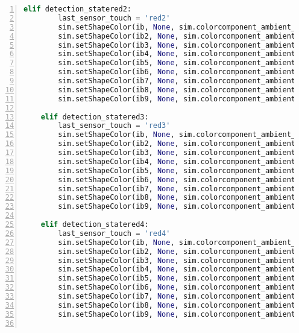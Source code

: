 \begin{lstlisting}[language=Python, frame=single, numbers=left, captionpos=b, basicstyle=\ttfamily\small, showstringspaces=false, breaklines=true, tabsize=4, xleftmargin=15pt]
    elif detection_statered2:
        last_sensor_touch = 'red2'
        sim.setShapeColor(ib, None, sim.colorcomponent_ambient_diffuse, [1, 0, 0])
        sim.setShapeColor(ib2, None, sim.colorcomponent_ambient_diffuse, [1, 0, 0])
        sim.setShapeColor(ib3, None, sim.colorcomponent_ambient_diffuse, [0, 0, 0])
        sim.setShapeColor(ib4, None, sim.colorcomponent_ambient_diffuse, [1, 1, 1])
        sim.setShapeColor(ib5, None, sim.colorcomponent_ambient_diffuse, [0, 0, 0])
        sim.setShapeColor(ib6, None, sim.colorcomponent_ambient_diffuse, [0, 0, 0])
        sim.setShapeColor(ib7, None, sim.colorcomponent_ambient_diffuse, [0, 0, 0])
        sim.setShapeColor(ib8, None, sim.colorcomponent_ambient_diffuse, [1, 1, 1])
        sim.setShapeColor(ib9, None, sim.colorcomponent_ambient_diffuse, [0, 0, 0])
 
    elif detection_statered3:
        last_sensor_touch = 'red3'
        sim.setShapeColor(ib, None, sim.colorcomponent_ambient_diffuse, [1, 0, 0])
        sim.setShapeColor(ib2, None, sim.colorcomponent_ambient_diffuse, [1, 0, 0])
        sim.setShapeColor(ib3, None, sim.colorcomponent_ambient_diffuse, [0, 0, 0])
        sim.setShapeColor(ib4, None, sim.colorcomponent_ambient_diffuse, [1, 1, 1])
        sim.setShapeColor(ib5, None, sim.colorcomponent_ambient_diffuse, [0, 0, 0])
        sim.setShapeColor(ib6, None, sim.colorcomponent_ambient_diffuse, [0, 0, 0])
        sim.setShapeColor(ib7, None, sim.colorcomponent_ambient_diffuse, [1, 1, 1])
        sim.setShapeColor(ib8, None, sim.colorcomponent_ambient_diffuse, [0, 0, 0])
        sim.setShapeColor(ib9, None, sim.colorcomponent_ambient_diffuse, [0, 0, 0])
 
    elif detection_statered4:
        last_sensor_touch = 'red4'
        sim.setShapeColor(ib, None, sim.colorcomponent_ambient_diffuse, [1, 0, 0])
        sim.setShapeColor(ib2, None, sim.colorcomponent_ambient_diffuse, [1, 0, 0])
        sim.setShapeColor(ib3, None, sim.colorcomponent_ambient_diffuse, [1, 1, 1])
        sim.setShapeColor(ib4, None, sim.colorcomponent_ambient_diffuse, [0, 0, 0])
        sim.setShapeColor(ib5, None, sim.colorcomponent_ambient_diffuse, [0, 0, 0])
        sim.setShapeColor(ib6, None, sim.colorcomponent_ambient_diffuse, [0, 0, 0])
        sim.setShapeColor(ib7, None, sim.colorcomponent_ambient_diffuse, [1, 1, 1])
        sim.setShapeColor(ib8, None, sim.colorcomponent_ambient_diffuse, [0, 0, 0])
        sim.setShapeColor(ib9, None, sim.colorcomponent_ambient_diffuse, [1, 1, 1])
 

\end{lstlisting}
